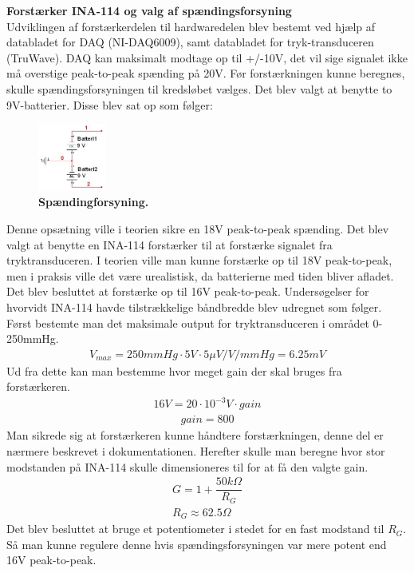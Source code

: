 \textbf{Forstærker INA-114 og valg af spændingsforsyning}\\
Udviklingen af forstærkerdelen til hardwaredelen blev bestemt ved hjælp af databladet for DAQ (NI-DAQ6009), samt databladet for tryk-transduceren (TruWave\texttrademark). DAQ kan maksimalt modtage op til +/-10V, det vil sige signalet ikke må overstige peak-to-peak spænding på 20V. Før forstærkningen kunne beregnes, skulle spændingsforsyningen til kredsløbet vælges. Det blev valgt at benytte to 9V-batterier. Disse blev sat op som følger:
\begin{figure}[H]
\includegraphics[width =0.2\textwidth , center]{billeder/spandingsforsyning}
\caption{\textbf{Spændingforsyning.}}
\end{figure}
Denne opsætning ville i teorien sikre en 18V peak-to-peak spænding. Det blev valgt at benytte en INA-114 forstærker til at forstærke signalet fra tryktransduceren. I teorien ville man kunne forstærke op til 18V peak-to-peak, men i praksis ville det være urealistisk, da batterierne med tiden bliver afladet. Det blev besluttet at forstærke op til 16V peak-to-peak. Undersøgelser for hvorvidt INA-114 havde tilstrækkelige båndbredde blev udregnet som følger. Først bestemte man det maksimale output for tryktransduceren i området 0-250mmHg.
\begin{align}
V_{max}=250mmHg\cdot 5V\cdot 5\mu V/V/mmHg =6.25 mV
\end{align}
Ud fra dette kan man bestemme hvor meget gain der skal bruges fra forstærkeren.
\begin{align}
16V = 20\cdot 10^{-3}V\cdot gain
\end{align}
\begin{align}
gain = 800
\end{align}
Man sikrede sig at forstærkeren kunne håndtere forstærkningen, denne del er nærmere beskrevet i dokumentationen. Herefter skulle man beregne hvor stor modstanden på INA-114 skulle dimensioneres til for at få den valgte gain.
\begin{align}
G=1+\dfrac{50k\Omega}{R_G}\\
R_G\approx 62.5\Omega
\end{align}
Det blev besluttet at bruge et potentiometer i stedet for en fast modstand til $R_G$. Så man kunne regulere denne hvis spændingsforsyningen var mere potent end 16V peak-to-peak.\\\\
